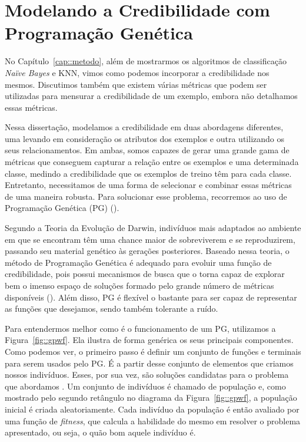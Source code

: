 
\chapter{Modelando a Credibilidade com Programação Genética}
\label{cap::programacao_genetica}

No Capítulo~\ref{cap::metodo},
além de mostrarmos os algoritmos de classificação \textit{Naïve Bayes} e \textsc{KNN}, vimos como podemos incorporar a credibilidade nos mesmos.
Discutimos também que existem várias métricas que podem ser utilizadas para mensurar a credibilidade de um exemplo, 
embora não detalhamos essas métricas.

Nessa dissertação, modelamos a credibilidade em duas abordagens diferentes, uma levando em consideração os atributos dos exemplos e outra utilizando os seus relacionamentos. 
Em ambas, somos capazes de gerar uma grande gama de métricas que conseguem capturar a relação entre os exemplos e uma determinada classe, medindo a credibilidade que os exemplos de treino têm para cada classe.
Entretanto, necessitamos de uma forma de selecionar e combinar essas métricas de uma maneira robusta. Para solucionar esse problema, recorremos ao uso de Programação Genética (\textsc{PG}) (\cite{Koza92}).

Segundo a Teoria da Evolução de Darwin, indivíduos mais adaptados ao ambiente em que se encontram têm uma chance maior de sobreviverem e se reproduzirem, passando seu material genético às gerações posteriores. Baseado nessa teoria, o método de Programação Genética é adequado para evoluir uma função de credibilidade, pois possui mecanismos de busca que o torna capaz de explorar bem o imenso espaço de soluções formado pelo grande número de métricas disponíveis (\cite{Fogel00}). Além disso, \textsc{PG} é flexível o bastante para ser capaz de representar as funções que desejamos, sendo também tolerante a ruído.

Para entendermos melhor como é o funcionamento de um \textsc{PG}, utilizamos a Figura~\ref{fig::gpwf}. Ela ilustra de forma genérica os seus principais componentes.
Como podemos ver, o primeiro passo é definir um conjunto de funções e terminais para serem usados pelo \textsc{PG}.
É a partir desse conjunto de elementos que criamos nossos indivíduos.
Esses, por sua vez, são soluções candidatas para o problema que abordamos
.
Um conjunto de indivíduos é chamado de população e, como mostrado pelo segundo retângulo no diagrama da Figura~\ref{fig::gpwf}, a população inicial é criada aleatoriamente. 
Cada indivíduo da população é então avaliado por uma função de \textit{fitness}, que calcula a habilidade do mesmo em resolver o problema apresentado, ou seja, o quão bom aquele indivíduo é.

